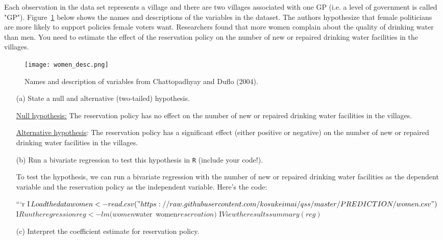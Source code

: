 \documentclass[12pt,letterpaper]{article}
\begin{document}
\begin{enumerate}
\noindent Each observation in the data set represents a village and there are two villages associated with one GP (i.e. a level of government is called "GP"). Figure~\ref{fig:women_desc} below shows the names and descriptions of the variables in the dataset. The authors hypothesize that female politicians are more likely to support policies female voters want. Researchers found that more women complain about the quality of drinking water than men. You need to estimate the effect of the reservation policy on the number of new or repaired drinking water facilities in the villages.
\vspace{.5cm}
\begin{figure}[h!]
	\caption{\footnotesize{Names and description of variables from Chattopadhyay and Duflo (2004).}}
	\vspace{.5cm}
	\centering
	\label{fig:women_desc}
	\texttt{[image: women\_desc.png]}
\end{figure}		

\newpage
\begin{enumerate}
	\item [(a)] State a null and alternative (two-tailed) hypothesis. 

\underline{Null hypothesis:} The reservation policy has no effect on the number of new or repaired drinking water facilities in the villages.

\underline{Alternative hypothesis}: The reservation policy has a significant effect (either positive or negative) on the number of new or repaired drinking water facilities in the villages.

	
	\vspace{2cm}
	\item [(b)] Run a bivariate regression to test this hypothesis in \texttt{R} (include your code!).
	
	To test the hypothesis, we can run a bivariate regression with the number of new or repaired drinking water facilities as the dependent variable and the reservation policy as the independent variable. Here's the code:
	
	```{r}
	I$Load the data
	women <- read.csv("https://raw.githubusercontent.com/kosukeimai/qss/master/PREDICTION/women.csv")
	$
	I$Run the regression
	reg <- lm(women$water~women$reservation)
$	
	I$View the results
	summary(reg)
$	
	\vspace{2cm}
	\item [(c)] Interpret the coefficient estimate for reservation policy. 
\end{enumerate}


\end{enumerate}
\end{document}
